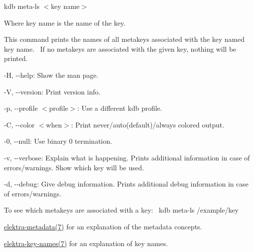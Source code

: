 {\ttfamily kdb meta-\/ls $<$key name$>$}

Where {\ttfamily key name} is the name of the key.

This command prints the names of all metakeys associated with the key named {\ttfamily key name}.~\newline
 If no metakeys are associated with the given key, nothing will be printed.~\newline



\begin{DoxyItemize}
\item {\ttfamily -\/H}, {\ttfamily -\/-\/help}\+: Show the man page.
\item {\ttfamily -\/V}, {\ttfamily -\/-\/version}\+: Print version info.
\item {\ttfamily -\/p}, {\ttfamily -\/-\/profile $<$profile$>$}\+: Use a different kdb profile.
\item {\ttfamily -\/C}, {\ttfamily -\/-\/color $<$when$>$}\+: Print never/auto(default)/always colored output.
\item {\ttfamily -\/0}, {\ttfamily -\/-\/null}\+: Use binary 0 termination.
\item {\ttfamily -\/v}, {\ttfamily -\/-\/verbose}\+: Explain what is happening. Prints additional information in case of errors/warnings. Show which key will be used.
\item {\ttfamily -\/d}, {\ttfamily -\/-\/debug}\+: Give debug information. Prints additional debug information in case of errors/warnings.
\end{DoxyItemize}

To see which metakeys are associated with a key\+:~\newline
 {\ttfamily kdb meta-\/ls /example/key}


\begin{DoxyItemize}
\item \mbox{\hyperlink{doc_help_elektra-metadata_md}{elektra-\/metadata(7)}} for an explanation of the metadata concepts.
\item \mbox{\hyperlink{doc_help_elektra-key-names_md}{elektra-\/key-\/names(7)}} for an explanation of key names. 
\end{DoxyItemize}